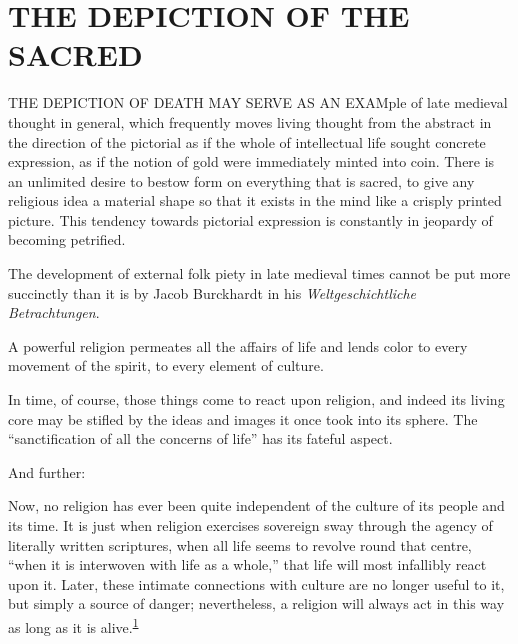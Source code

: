 \chapter{THE DEPICTION OF THE SACRED}

THE DEPICTION OF DEATH MAY SERVE AS AN EXAMple of late medieval thought
in general, which frequently moves living thought from the abstract in
the direction of the pictorial as if the whole of intellectual life
sought concrete expression, as if the notion of gold were immediately
minted into coin. There is an unlimited desire to bestow form on
everything that is sacred, to give any religious idea a material shape
so that it exists in the mind like a crisply printed picture. This
tendency towards pictorial expression is constantly in jeopardy of
becoming petrified.

The development of external folk piety in late medieval times cannot be
put more succinctly than it is by Jacob Burckhardt in his
\emph{Weltgeschichtliche Betrachtungen}.

A powerful religion permeates all the affairs of life and lends color to
every movement of the spirit, to every element of culture.

In time, of course, those things come to react upon religion, and indeed
its living core may be stifled by the ideas and images it once took into
its sphere. The ``sanctification of all the concerns of life'' has its
fateful aspect.

And further:

Now, no religion has ever been quite independent of the culture of its
people and its time. It is just when religion exercises sovereign sway
through the agency of literally written scriptures, when all life seems
to revolve round that centre, ``when it is interwoven with life as a
whole,'' that life will most infallibly react upon it. Later, these
intimate connections with culture are no longer useful to it, but simply
a source of danger; nevertheless, a religion will always act in this way
as long as it is
alive.\textsuperscript{\protect\hypertarget{13_Chapter_Six__THE_DEPICTION_OF_TH.xhtmlux5cux23id_1269}{\protect\hyperlink{23_NOTES.xhtmlux5cux23id_1270}{1}}}

